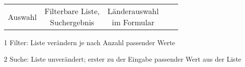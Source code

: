 \begin{table}[!htb]
\begin{adjustbox}{max width=0.95\textwidth}
\begin{threeparttable}
\begin{tabular}{ l || c | c | c | c }
{                                                           Auswahl} & \tbbr{Filterbare Liste, \\ 
                                                                            Suchergebnis} & \tbbr{Länderauswahl \\ 
                                                                                                  im Formular} \\
            \end{tabular}
            \begin{tablenotes}
                \scriptsize
                \item[1] Filter: Liste verändern je nach Anzahl passender Werte
                \item[2] Suche: Liste unverändert; erster zu der Eingabe passender Wert aus der Liste     
            \end{tablenotes}
        \end{threeparttable}
    \end{adjustbox}
\end{table}
